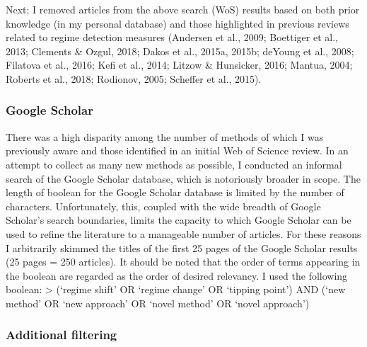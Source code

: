 \documentclass[12pt,twoside,openany]{reedthesis}
\begin{document}
Next; I removed articles from the above search (WoS) results based on
both prior knowledge (in my personal database) and those highlighted in
previous reviews related to regime detection measures (Andersen et al.,
2009; Boettiger et al., 2013; Clements \& Ozgul, 2018; Dakos et al.,
2015a, 2015b; deYoung et al., 2008; Filatova et al., 2016; Kefi et al.,
2014; Litzow \& Hunsicker, 2016; Mantua, 2004; Roberts et al., 2018;
Rodionov, 2005; Scheffer et al., 2015).

\subsubsection{Google Scholar}\label{google-scholar}

There was a high disparity among the number of methods of which I was
previously aware and those identified in an initial Web of Science
review. In an attempt to collect as many new methods as possible, I
conducted an informal search of the Google Scholar database, which is
notoriously broader in scope. The length of boolean for the Google
Scholar database is limited by the number of characters. Unfortunately,
this, coupled with the wide breadth of Google Scholar's search
boundaries, limits the capacity to which Google Scholar can be used to
refine the literature to a manageable number of articles. For these
reasons I arbitrarily skimmed the titles of the first 25 pages of the
Google Scholar results (25 pages = 250 articles). It should be noted
that the order of terms appearing in the boolean are regarded as the
order of desired relevancy. I used the following boolean: \textgreater{}
(`regime shift' OR `regime change' OR `tipping point') AND (`new method'
OR `new approach' OR `novel method' OR `novel approach')

\subsubsection{Additional filtering}\label{additional-filtering}
\end{document}
